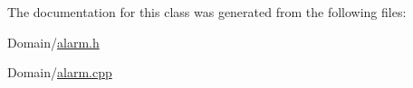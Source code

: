 The documentation for this class was generated from the following files\+:\begin{DoxyCompactItemize}
\item 
Domain/\hyperlink{alarm_8h}{alarm.\+h}\item 
Domain/\hyperlink{alarm_8cpp}{alarm.\+cpp}\end{DoxyCompactItemize}
